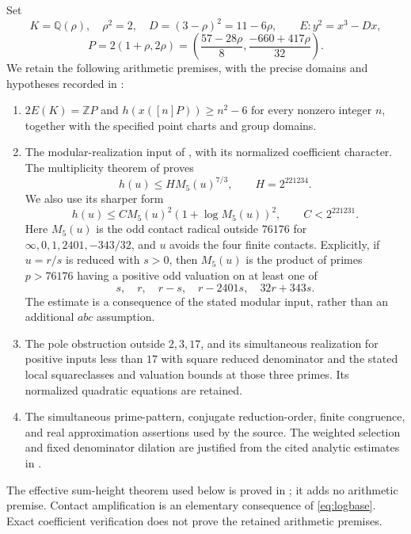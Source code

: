 \documentclass[11pt,a4paper]{article}
\newcommand{\Q}{\mathbb Q}\newcommand{\Z}{\mathbb Z}\newcommand{\HH}{\mathcal H}
\begin{document}
Set
\[
 K=\Q(\rho),\quad \rho^2=2,\quad D=(3-\rho)^2=11-6\rho,
 \qquad E:y^2=x^3-Dx,
\]
\[
 P=2(1+\rho,2\rho)
 =\left(\frac{57-28\rho}{8},\frac{-660+417\rho}{32}\right).
\]
We retain the following arithmetic premises, with the precise domains
and hypotheses recorded in \cite{Dependencies,Source,Weights}:
\begin{enumerate}
\item $2E(K)=\Z P$ and $h(x([n]P))\ge n^2-6$ for every nonzero
integer $n$, together with the specified point charts and group domains.
\item The modular-realization input of
\cite[Definition~6.1]{NewHeight}, with its normalized coefficient
character. The multiplicity theorem of
\cite[Theorem~4.1]{Multiplicity} proves
\begin{equation}\label{eq:baseheight}
 h(u)\le H M_5(u)^{7/3},\qquad H=2^{221234}.
\end{equation}
We also use its sharper form
\begin{equation}\label{eq:logbase}
 h(u)\le C M_5(u)^2(1+\log M_5(u))^2,\qquad C<2^{221231}.
\end{equation}
Here $M_5(u)$ is the odd contact radical outside $76176$ for
$\infty,0,1,2401,-343/32$, and $u$ avoids the four finite contacts.
Explicitly, if $u=r/s$ is reduced with $s>0$, then $M_5(u)$ is
the product of primes $p>76176$ having a positive odd valuation on
at least one of
\[
           s,\quad r,\quad r-s,\quad r-2401s,\quad32r+343s.
\]
The estimate is a consequence of the stated modular input, rather
than an additional $abc$ assumption.
\item The pole obstruction outside $2,3,17$, and its simultaneous
realization for positive inputs less than $17$ with square reduced
denominator and the stated local squareclasses and valuation bounds
at those three primes. Its normalized quadratic equations are retained.
\item The simultaneous prime-pattern, conjugate reduction-order,
finite congruence, and real approximation assertions used by the source.
The weighted selection and fixed denominator dilation are justified
from the cited analytic estimates in \cite{Selection}.
\end{enumerate}
The effective sum-height theorem used below is proved in
\cite{Sums}; it adds no arithmetic premise. Contact amplification is
an elementary consequence of \eqref{eq:logbase}. Exact coefficient
verification does not prove the retained arithmetic premises.
\end{document}
